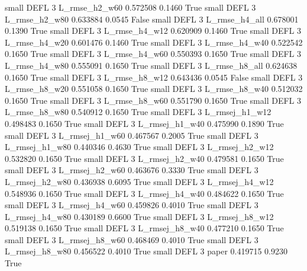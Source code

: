      small     DEFL                 3  L_rmse_h2_w60   0.572508      0.1460    True
     small     DEFL                 3  L_rmse_h2_w80   0.633884      0.0545   False
     small     DEFL                 3  L_rmse_h4_all   0.678001      0.1390    True
     small     DEFL                 3  L_rmse_h4_w12   0.620909      0.1460    True
     small     DEFL                 3  L_rmse_h4_w20   0.601476      0.1460    True
     small     DEFL                 3  L_rmse_h4_w40   0.522542      0.1650    True
     small     DEFL                 3  L_rmse_h4_w60   0.550393      0.1650    True
     small     DEFL                 3  L_rmse_h4_w80   0.555091      0.1650    True
     small     DEFL                 3  L_rmse_h8_all   0.624638      0.1650    True
     small     DEFL                 3  L_rmse_h8_w12   0.643436      0.0545   False
     small     DEFL                 3  L_rmse_h8_w20   0.551058      0.1650    True
     small     DEFL                 3  L_rmse_h8_w40   0.512032      0.1650    True
     small     DEFL                 3  L_rmse_h8_w60   0.551790      0.1650    True
     small     DEFL                 3  L_rmse_h8_w80   0.540912      0.1650    True
     small     DEFL                 3 L_rmsej_h1_w12   0.498483      0.1650    True
     small     DEFL                 3 L_rmsej_h1_w40   0.475990      0.1890    True
     small     DEFL                 3 L_rmsej_h1_w60   0.467567      0.2005    True
     small     DEFL                 3 L_rmsej_h1_w80   0.440346      0.4630    True
     small     DEFL                 3 L_rmsej_h2_w12   0.532820      0.1650    True
     small     DEFL                 3 L_rmsej_h2_w40   0.479581      0.1650    True
     small     DEFL                 3 L_rmsej_h2_w60   0.463676      0.3330    True
     small     DEFL                 3 L_rmsej_h2_w80   0.436938      0.6095    True
     small     DEFL                 3 L_rmsej_h4_w12   0.548936      0.1650    True
     small     DEFL                 3 L_rmsej_h4_w40   0.484622      0.1650    True
     small     DEFL                 3 L_rmsej_h4_w60   0.459826      0.4010    True
     small     DEFL                 3 L_rmsej_h4_w80   0.430189      0.6600    True
     small     DEFL                 3 L_rmsej_h8_w12   0.519138      0.1650    True
     small     DEFL                 3 L_rmsej_h8_w40   0.477210      0.1650    True
     small     DEFL                 3 L_rmsej_h8_w60   0.468469      0.4010    True
     small     DEFL                 3 L_rmsej_h8_w80   0.456522      0.4010    True
     small     DEFL                 3          paper   0.419715      0.9230    True

